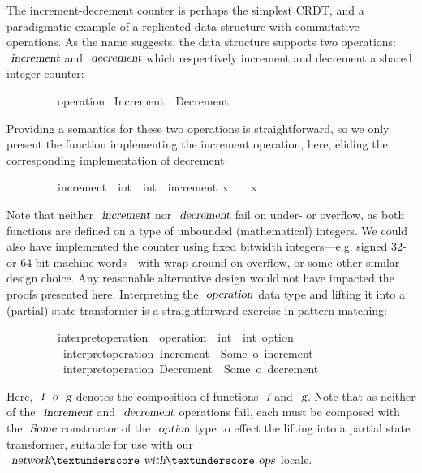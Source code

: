 The increment-decrement counter is perhaps the simplest CRDT, and a paradigmatic example of a replicated data structure with commutative operations.
As the name suggests, the data structure supports two operations: $\isa{increment}$ and $\isa{decrement}$ which respectively increment and decrement a shared integer counter:
\vspace{0.35em}
\begin{isabellebody}
\ \ \ \ \ \ \ \ \ operation {\isacharequal}\ Increment\ {\isacharbar}\ Decrement
\end{isabellebody}
\vspace{0.35em}
Providing a semantics for these two operations is straightforward, so we only present the function implementing the increment operation, here, eliding the corresponding implementation of decrement:
\vspace{0.35em}
\begin{isabellebody}
\ \ \ \ \ \ \ \ \ increment\ {\isacharcolon}{\isacharcolon}\ {\isachardoublequoteopen}int\ {\isasymRightarrow}\ int{\isachardoublequoteclose}\ \ {\isachardoublequoteopen}increment\ x\ {\isasymequiv}\ {}\ {\isacharplus}\ x{\isachardoublequoteclose}
\end{isabellebody}
\vspace{0.35em}
Note that neither $\isa{increment}$ nor $\isa{decrement}$ fail on under- or overflow, as both functions are defined on a type of unbounded (mathematical) integers.
We could also have implemented the counter using fixed bitwidth integers---e.g. signed 32- or 64-bit machine words---with wrap-around on overflow, or some other similar design choice.
Any reasonable alternative design would not have impacted the proofs presented here.
Interpreting the $\isa{operation}$ data type and lifting it into a (partial) state transformer is a straightforward exercise in pattern matching:
\vspace{0.35em}
\begin{isabellebody}
\ \ \ \ \ \ \ \ \ interpret{\isacharunderscore}operation\ {\isacharcolon}{\isacharcolon}\ {\isachardoublequoteopen}operation\ {\isasymRightarrow}\ int\ {\isasymRightarrow}\ int\ option{\isachardoublequoteclose}\ \isanewline
\ \ \ \ \ \ \ \ \ \ {\isachardoublequoteopen}interpret{\isacharunderscore}operation\ Increment\ {\isacharequal}\ Some\ o\ increment{\isachardoublequoteclose}\ {\isacharbar}\isanewline
\ \ \ \ \ \ \ \ \ \ {\isachardoublequoteopen}interpret{\isacharunderscore}operation\ Decrement\ {\isacharequal}\ Some\ o\ decrement{\isachardoublequoteclose}
\end{isabellebody}
\vspace{0.35em}
Here, $\isa{f}\ \isa{o}\ \isa{g}$ denotes the composition of functions $\isa{f}$ and $\isa{g}$.
Note that as neither of the $\isa{increment}$ and $\isa{decrement}$ operations fail, each must be composed with the $\isa{Some}$ constructor of the $\isa{option}$ type to effect the lifting into a partial state transformer, suitable for use with our $\isa{network}{\isacharunderscore}\isa{with}{\isacharunderscore}\isa{ops}$ locale.

